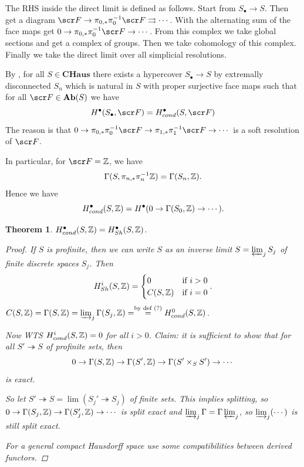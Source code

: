 \documentclass[A4paper, british]{amsart}
\theoremstyle{darkgreentheorem}
\newtheorem{thm}{Theorem}[section]
\theoremstyle{darkbluedefinition}
\theoremstyle{darkredexample}
\theoremstyle{remark}
\newcommand{\CHaus}{\mathbf{CHaus}}
\newcommand{\1}{\mathbbm{1}}
\newcommand{\fp}[1]{\times_{#1}}
\newcommand{\grd}{^{\bullet}}
\begin{document}
The RHS inside the direct limit is defined as follows.
Start from $S_{\bullet}\to S$.
Then get a diagram $\F\to \pi_{0,*}\pi_{0}^{-1}\F\rightrightarrows \cdots $.
With the alternating sum of the face maps get $0\to \pi_{0,*}\pi_{0}^{-1}\F\to \cdots $.
From this complex we take global sections and get a complex of groups.
Then we take cohomology of this complex.
Finally we take the direct limit over all simplicial resolutions.

By \cite[Theorems 2.3, 3.10-11]{dyc76}, for all $S\in \CHaus$ there exists a hypercover $S_{\bullet}\to S$ by extremally disconnected $S_{n}$ which is natural in $S$ with proper surjective face maps such that for all $\F\in \Ab(S)$ we have
\[ H\grd(S_{\bullet},\F)=H\grd_{cond}(S,\F) \]
The reason is that $0\to \pi_{0,*}\pi_{0}^{-1}\F\to \pi_{1,*}\pi_{1}^{-1}\F\to \cdots $ is a soft resolution of $\F$.

In particular, for $\F=\Z$, we have
\[ \Gamma(S,\pi_{n,*}\pi_{n}^{-1}\mathbb{Z})=\Gamma(S_{n},\mathbb{Z}). \]
Hence we have
\[ H_{cond}\grd(S,\Z)=H\grd(0\to \Gamma(S_{0},\Z)\to \cdots ).\]

\begin{thm}
    $H\grd_{cond}(S,\Z)=H\grd_{Sh}(S,\Z)$.
    \begin{proof}
	If $S$ is profinite, then we can write $S$ as an inverse limit $S=\varprojlim_{j} S_{j}$ of finite discrete spaces $S_{j}$.
	Then
	\[ H^{i}_{Sh}(S,\mathbb{Z})=\begin{cases} 0 & \text{if } i>0 \\ C(S,\mathbb{Z}) & \text{if } i=0 \end{cases}. \]
	    \marginnote{\dbend}$C(S,\mathbb{Z})=\Gamma(S,\mathbb{Z})= \varinjlim_{j}\Gamma(S_{j},\mathbb{Z})=\overset{\text{by def } (?)}{=} H^{0}_{cond}(S,\mathbb{Z})$.
	
	Now WTS $H_{cond}^{i}(S,\mathbb{Z})=0$ for all $i>0$.
	\marginnote{\dbend} Claim: it is sufficient to show that for all $S'\twoheadrightarrow S$ of profinite sets, then
	\[ 0\to \Gamma(S,\Z)\to \Gamma(S',\Z)\to \Gamma(S'\fp{S}S')\to \cdots \]
	is exact.

	So let $S'\twoheadrightarrow S=\lim(S_{j}'\twoheadrightarrow S_{j})$ of finite sets.
	This implies splitting, so $0\to \Gamma(S_{j},\mathbb{Z})\to \Gamma(S'_{j},\mathbb{Z})\to \cdots $ is split exact and $\varinjlim_{j}\Gamma=\Gamma \varprojlim_{j}$, so $\varinjlim_{j}(\cdots)$ is still split exact.
	
	For a general compact Hausdorff space use some compatibilities between derived functors.
    \end{proof}
\end{thm}
\end{document}

